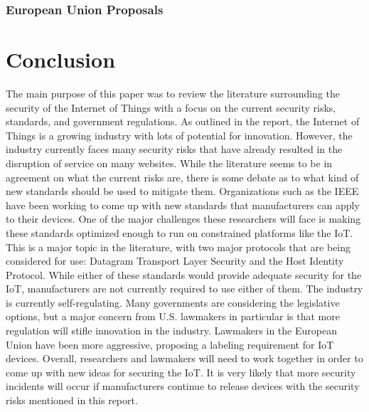 \documentclass[letterpaper, 12pt]{article}
\begin{document}
\begin{flushleft}
\subsubsection*{European Union Proposals}

\section*{Conclusion}

The main purpose of this paper was to review the literature surrounding the security of the Internet of Things with a focus on the current security risks,
standards, and government regulations. As outlined in the report, the Internet of Things is a growing industry with lots of potential for innovation. 
However, the industry currently faces many security risks that have already resulted in the disruption of service on many websites. While the literature
seems to be in agreement on what the current risks are, there is some debate as to what kind of new standards should be used to mitigate them. Organizations
such as the IEEE have been working to come up with new standards that manufacturers can apply to their devices. One of the major challenges these researchers
will face is making these standards optimized enough to run on constrained platforms like the IoT. This is a major topic in the literature, with two major 
protocols that are being considered for use: Datagram Transport Layer Security and the Host Identity Protocol. While either of these standards would provide
adequate security for the IoT, manufacturers are not currently required to use either of them. The industry is currently self-regulating. Many governments
are considering the legislative options, but a major concern from U.S. lawmakers in particular is that more regulation will stifle innovation in the industry. 
Lawmakers in the European Union have been more aggressive, proposing a labeling requirement for IoT devices. Overall, researchers and lawmakers will need to
work together in order to come up with new ideas for securing the IoT. It is very likely that more security incidents will occur if manufacturers continue
to release devices with the security risks mentioned in this report. 
\newpage
{}
\printbibliography
\end{flushleft}
\end{document}
